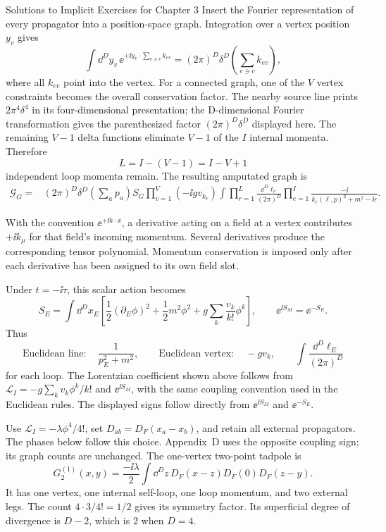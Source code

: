 \begin{bankssolutions}{Solutions to Implicit Exercises for Chapter 3}
Insert the Fourier representation of every propagator into a position-space
graph.  Integration over a vertex position $y_v$ gives
\[
 \int\dd^D y_v\,\ee^{+\ii y_v\mathbin{\cdot}\sum_{e\ni v}k_{ev}}
 =(2\pi)^D\delta^D\!\left(\sum_{e\ni v}k_{ev}\right),
\]
where all $k_{ev}$ point into the vertex.  For a connected graph, one of the
$V$ vertex constraints becomes the overall conservation factor.  The nearby
source line prints $2\pi^4\delta^4$ in its four-dimensional presentation;
the D-dimensional Fourier transformation gives the parenthesized factor
$(2\pi)^D\delta^D$ displayed here.
The remaining $V-1$ delta functions eliminate $V-1$ of the $I$ internal
momenta.  Therefore
\[
 L=I-(V-1)=I-V+1
\]
independent loop momenta remain.  The resulting amputated graph is
\begin{align*}
 \mathcal G_G={}&(2\pi)^D\delta^D\!\left(\sum_a p_a\right)S_G
 \prod_{v=1}^{V}(-\ii g v_{k_v})
 \int\prod_{r=1}^{L}\frac{\dd^D\ell_r}{(2\pi)^D}
 \prod_{e=1}^{I}
 \frac{-\ii}{k_e(\ell,p)^2+m^2-\ii\varepsilon}.
\end{align*}

With the convention $\ee^{+\ii k\mathbin{\cdot}x}$, a derivative acting on a field at a
vertex contributes $+\ii k_\mu$ for that field's incoming momentum.  Several
derivatives produce the corresponding tensor polynomial.  Momentum
conservation is imposed only after each derivative has been assigned to its
own field slot.

Under $t=-\ii\tau$, this scalar action becomes
\[
 S_E=\int\dd^D x_E\left[\frac12(\partial_E\phi)^2
 +\frac12m^2\phi^2+g\sum_k\frac{v_k}{k!}\phi^k\right],
 \qquad \ee^{\ii S_M}=\ee^{-S_E}.
\]
Thus
\[
 \text{Euclidean line}:\quad\frac{1}{p_E^2+m^2},
 \qquad
 \text{Euclidean vertex}:\quad-gv_k,
 \qquad
 \int\frac{\dd^D\ell_E}{(2\pi)^D}
\]
for each loop.  The Lorentzian coefficient shown above follows from
$\mathcal L_I=-g\sum_kv_k\phi^k/k!$ and $\ee^{\ii S_M}$, with the same
coupling convention used in the Euclidean rules.  The displayed signs follow
directly from $\ee^{\ii S_M}$ and $\ee^{-S_E}$.

Use $\mathcal L_I=-\lambda\phi^4/4!$, set
$D_{ab}=D_F(x_a-x_b)$, and retain all external propagators.  The phases below
follow this choice.  Appendix~D uses the opposite coupling sign; its graph
counts are unchanged.  The one-vertex two-point tadpole is
\[
 G^{(1)}_2(x,y)=\frac{-\ii\lambda}{2}
 \int\dd^D z\,D_F(x-z)D_F(0)D_F(z-y).
\]
It has one vertex, one internal self-loop, one loop momentum, and two external
legs.  The count $4\cdot3/4!=1/2$ gives its symmetry factor.  Its superficial
degree of divergence is $D-2$, which is $2$ when $D=4$.


\end{bankssolutions}
